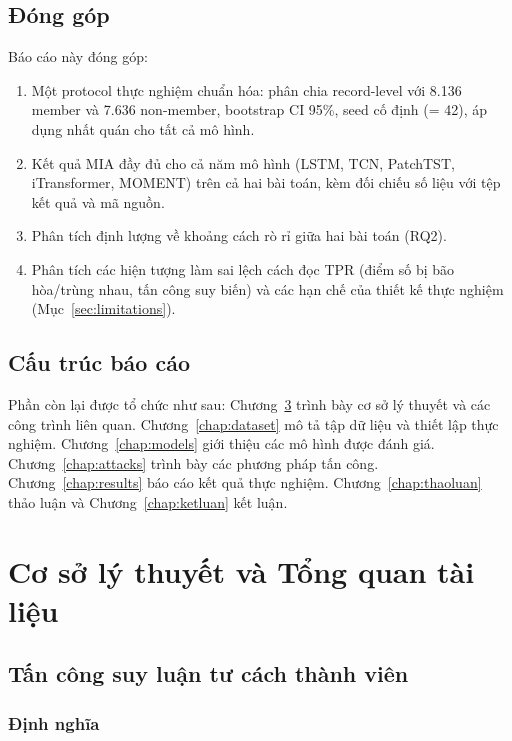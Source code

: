 \documentclass[12pt,a4paper]{report}
\begin{document}
\section{Đóng góp}

Báo cáo này đóng góp:
\begin{enumerate}
  \item Một protocol thực nghiệm chuẩn hóa: phân chia record-level với 8.136 member và 7.636 non-member, bootstrap CI 95\%, seed cố định (= 42), áp dụng nhất quán cho tất cả mô hình.
  \item Kết quả MIA đầy đủ cho cả năm mô hình (LSTM, TCN, PatchTST, iTransformer, MOMENT) trên cả hai bài toán, kèm đối chiếu số liệu với tệp kết quả và mã nguồn.
  \item Phân tích định lượng về khoảng cách rò rỉ giữa hai bài toán (RQ2).
  \item Phân tích các hiện tượng làm sai lệch cách đọc TPR (điểm số bị bão hòa/trùng nhau, tấn công suy biến) và các hạn chế của thiết kế thực nghiệm (Mục~\ref{sec:limitations}).
\end{enumerate}

\section{Cấu trúc báo cáo}

Phần còn lại được tổ chức như sau: Chương~\ref{chap:lythuyet} trình bày cơ sở lý thuyết và các công trình liên quan. Chương~\ref{chap:dataset} mô tả tập dữ liệu và thiết lập thực nghiệm. Chương~\ref{chap:models} giới thiệu các mô hình được đánh giá. Chương~\ref{chap:attacks} trình bày các phương pháp tấn công. Chương~\ref{chap:results} báo cáo kết quả thực nghiệm. Chương~\ref{chap:thaoluan} thảo luận và Chương~\ref{chap:ketluan} kết luận.

\chapter{Cơ sở lý thuyết và Tổng quan tài liệu}
\label{chap:lythuyet}

\section{Tấn công suy luận tư cách thành viên}

\subsection{Định nghĩa}
\end{document}
